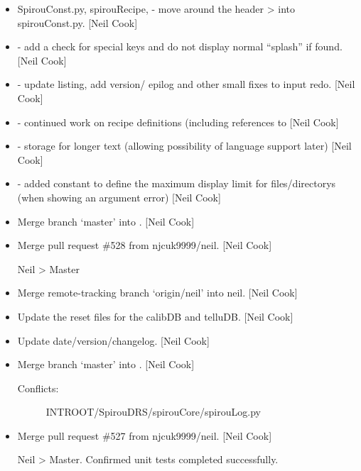 \documentclass[a4paper,10pt,english]{report}
\begin{document}
\label{\detokenize{misc/changelog:id220}}\begin{itemize}
\item {} 
SpirouConst.py, spirouRecipe,  - move around the
header \textendash{}\textgreater{} into spirouConst.py. {[}Neil Cook{]}

\item {} 
 - add a check for special keys and do not display
normal “splash” if found. {[}Neil Cook{]}

\item {} 
 - update listing, add version/ epilog and other small
fixes to input redo. {[}Neil Cook{]}

\item {} 
 - continued work on recipe definitions (including
references to  {[}Neil Cook{]}

\item {} 
 - storage for longer text (allowing possibility
of language support later) {[}Neil Cook{]}

\item {} 
 - added constant to define the maximum display limit
for files/directorys (when showing an argument error) {[}Neil Cook{]}

\item {} 
Merge branch ‘master’ into . {[}Neil Cook{]}

\item {} 
Merge pull request \#528 from njcuk9999/neil. {[}Neil Cook{]}

Neil \textendash{}\textgreater{} Master

\item {} 
Merge remote-tracking branch ‘origin/neil’ into neil. {[}Neil Cook{]}

\item {} 
Update the reset files for the calibDB and telluDB. {[}Neil Cook{]}

\item {} 
Update date/version/changelog. {[}Neil Cook{]}

\item {} 
Merge branch ‘master’ into . {[}Neil Cook{]}
\begin{description}
\item[{Conflicts:}] \leavevmode
INTROOT/SpirouDRS/spirouCore/spirouLog.py

\end{description}

\item {} 
Merge pull request \#527 from njcuk9999/neil. {[}Neil Cook{]}

Neil \textendash{}\textgreater{} Master. Confirmed unit tests completed successfully.

\end{itemize}
\end{document}
